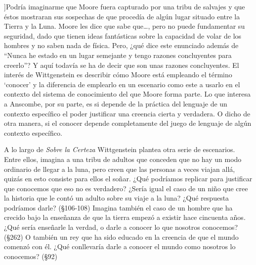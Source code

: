 ]{Podría imaginarme que Moore fuera capturado por una tribu de salvajes y que éstos mostraran sus sospechas de que procedía de algún lugar situado entre la Tierra y la Luna. Moore les dice que sabe que\ldots, pero no puede fundamentar su seguridad, dado que tienen ideas fantásticas sobre la capacidad de volar de los hombres y no saben nada de física. \textelp{} Pero, ¿qué dice este enunciado además de ``Nunca he estado en un lugar semejante y tengo razones concluyentes para creerlo''? Y aquí todavía se ha de decir que son unas razones concluyentes}.  El interés de Wittgenstein es describir cómo Moore está empleando el término `conocer' y la diferencia de emplearlo en un escenario como este a usarlo en el contexto del sistema de conocimiento del que Moore forma parte. Lo que interesa a Anscombe, por su parte, es si depende de la práctica del lenguaje de un contexto específico el poder justificar una creencia cierta y verdadera. O dicho de otra manera, si el conocer depende completamente del juego de lenguaje de algún contexto específico.

A lo largo de \emph{Sobre la Certeza} Wittgenstein plantea otra serie de escenarios. Entre ellos, imagina a una tribu de adultos que conceden que no hay un modo ordinario de llegar a la luna, pero creen que las personas a veces viajan allá, quizás en esto consiste para ellos el soñar. ¿Qué podríamos replicar para justificar que conocemos que eso no es verdadero? ¿Sería igual el caso de un niño que cree la historia que le contó un adulto sobre su viaje a la luna? ¿Qué respuesta podríamos darle? (\S106-108) Imagina también el caso de un hombre que ha crecido bajo la enseñanza de que la tierra empezó a existir hace cincuenta años. ¿Qué sería enseñarle la verdad, o darle a conocer lo que nosotros conocemos? (\S262) O también un rey que ha sido educado en la creencia de que el mundo comenzó con él. ¿Qué conllevaría darle a conocer el mundo como nosotros lo conocemos? (\S92)


